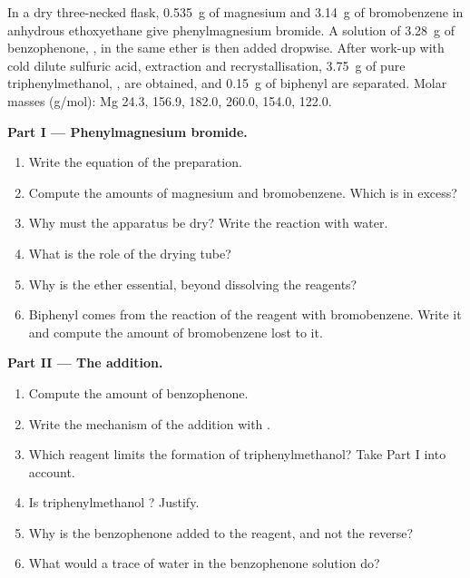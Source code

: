\begin{problem}
\label{pb:b1:organomagnesium:1}
In a dry three-necked flask, \qty{0.535}{g} of magnesium and
\qty{3.14}{g} of bromobenzene in anhydrous ethoxyethane give
phenylmagnesium bromide. A solution of \qty{3.28}{g} of benzophenone,
, in the same ether is then added dropwise. After work-up
with cold dilute sulfuric acid, extraction and recrystallisation,
\qty{3.75}{g} of pure triphenylmethanol, , are obtained,
and \qty{0.15}{g} of biphenyl are separated. Molar masses (\unit{g/mol}):
Mg 24.3,  156.9,  182.0,  260.0,
 154.0,  122.0.

\medskip
\noindent\textbf{Part I --- Phenylmagnesium bromide.}
\begin{enumerate}
  \item Write the equation of the preparation.
  \item Compute the amounts of magnesium and bromobenzene. Which is in
        excess?
  \item Why must the apparatus be dry? Write the reaction with water.
  \item What is the role of the drying tube?
  \item Why is the ether essential, beyond dissolving the reagents?
  \item Biphenyl comes from the reaction of the reagent with bromobenzene.
        Write it and compute the amount of bromobenzene lost to it.
\end{enumerate}

\medskip
\noindent\textbf{Part II --- The addition.}
\begin{enumerate}[resume]
  \item Compute the amount of benzophenone.
  \item Write the mechanism of the addition with .
  \item Which reagent limits the formation of triphenylmethanol? Take
        Part I into account.
  \item Is triphenylmethanol ? Justify.
  \item Why is the benzophenone added to the reagent, and not the reverse?
  \item What would a trace of water in the benzophenone solution do?
\end{enumerate}


\end{problem}
